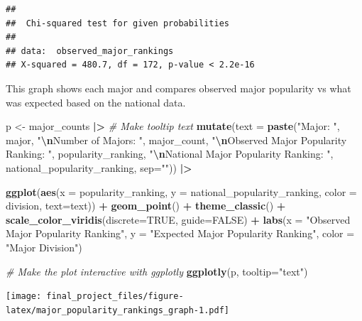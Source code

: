 \documentclass[
  twocolumn]{article}
\newenvironment{Shaded}{\begin{snugshade}}{\end{snugshade}}
\newcommand{\AttributeTok}[1]{\textcolor[rgb]{0.13,0.29,0.53}{#1}}
\newcommand{\CommentTok}[1]{\textcolor[rgb]{0.56,0.35,0.01}{\textit{#1}}}
\newcommand{\ConstantTok}[1]{\textcolor[rgb]{0.56,0.35,0.01}{#1}}
\newcommand{\FunctionTok}[1]{\textcolor[rgb]{0.13,0.29,0.53}{\textbf{#1}}}
\newcommand{\NormalTok}[1]{#1}
\newcommand{\OtherTok}[1]{\textcolor[rgb]{0.56,0.35,0.01}{#1}}
\newcommand{\SpecialCharTok}[1]{\textcolor[rgb]{0.81,0.36,0.00}{\textbf{#1}}}
\newcommand{\StringTok}[1]{\textcolor[rgb]{0.31,0.60,0.02}{#1}}
\begin{document}
\begin{verbatim}
## 
##  Chi-squared test for given probabilities
## 
## data:  observed_major_rankings
## X-squared = 480.7, df = 172, p-value < 2.2e-16
\end{verbatim}

This graph shows each major and compares observed major popularity vs
what was expected based on the national data.

\begin{Shaded}
\begin{Highlighting}[]
\NormalTok{p }\OtherTok{\textless{}{-}}\NormalTok{ major\_counts }\SpecialCharTok{|\textgreater{}}
  \CommentTok{\# Make tooltip text}
    \FunctionTok{mutate}\NormalTok{(}\AttributeTok{text =} \FunctionTok{paste}\NormalTok{(}\StringTok{"Major: "}\NormalTok{, major, }\StringTok{"}\SpecialCharTok{\textbackslash{}n}\StringTok{Number of Majors: "}\NormalTok{, major\_count, }\StringTok{"}\SpecialCharTok{\textbackslash{}n}\StringTok{Observed Major Popularity Ranking: "}\NormalTok{, popularity\_ranking, }\StringTok{"}\SpecialCharTok{\textbackslash{}n}\StringTok{National Major Popularity Ranking: "}\NormalTok{, national\_popularity\_ranking, }\AttributeTok{sep=}\StringTok{""}\NormalTok{)) }\SpecialCharTok{|\textgreater{}}
  
  \FunctionTok{ggplot}\NormalTok{(}\FunctionTok{aes}\NormalTok{(}\AttributeTok{x =}\NormalTok{ popularity\_ranking,}
           \AttributeTok{y =}\NormalTok{ national\_popularity\_ranking,}
           \AttributeTok{color =}\NormalTok{ division,}
           \AttributeTok{text=}\NormalTok{text)) }\SpecialCharTok{+}
  \FunctionTok{geom\_point}\NormalTok{() }\SpecialCharTok{+}
  \FunctionTok{theme\_classic}\NormalTok{() }\SpecialCharTok{+}
  \FunctionTok{scale\_color\_viridis}\NormalTok{(}\AttributeTok{discrete=}\ConstantTok{TRUE}\NormalTok{, }\AttributeTok{guide=}\ConstantTok{FALSE}\NormalTok{) }\SpecialCharTok{+}
  \FunctionTok{labs}\NormalTok{(}\AttributeTok{x =} \StringTok{"Observed Major Popularity Ranking"}\NormalTok{,}
       \AttributeTok{y =} \StringTok{"Expected Major Popularity Ranking"}\NormalTok{,}
       \AttributeTok{color =} \StringTok{"Major Division"}\NormalTok{)}

\CommentTok{\# Make the plot interactive with ggplotly}
\FunctionTok{ggplotly}\NormalTok{(p, }\AttributeTok{tooltip=}\StringTok{"text"}\NormalTok{)}
\end{Highlighting}
\end{Shaded}

\texttt{[image: final\_project\_files/figure-latex/major\_popularity\_rankings\_graph-1.pdf]}
\end{document}
